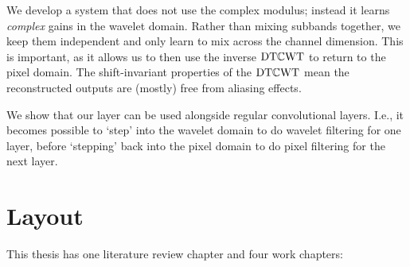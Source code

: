 We develop a system that does not use the complex modulus; instead it 
learns \emph{complex} gains in the wavelet domain. 
Rather than mixing subbands together, we keep them independent and only learn to
mix across the channel dimension. This is important, as it allows us to then use the inverse
$\mathrm{DT}\mathbb{C}\mathrm{WT}$ to return to the pixel domain. The shift-invariant properties of the $\mathrm{DT}\mathbb{C}\mathrm{WT}$ mean the
reconstructed outputs are (mostly) free from aliasing effects.

We show that our layer can be used alongside regular convolutional
layers. I.e., it becomes possible to `step' into the wavelet domain to do
wavelet filtering for one layer, before `stepping' back into the pixel domain to 
do pixel filtering for the next layer. 

\section{Layout}
This thesis has one literature review chapter and four work chapters:
